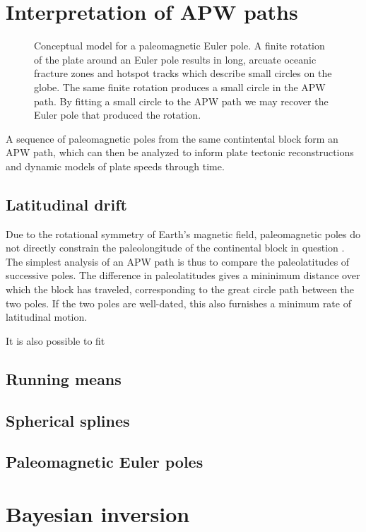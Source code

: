 \documentclass[preprint,12pt,authoryear]{elsarticle}
\begin{document}
\section{Interpretation of APW paths}
\label{sec:apwp}
\begin{figure}
\caption[Conceptual model for a paleomagnetic Euler pole.]{Conceptual model for a paleomagnetic Euler pole. A finite rotation of the plate around an Euler pole results in long, arcuate oceanic fracture zones and hotspot tracks which describe small circles on the globe. The same finite rotation produces a small circle in the APW path. By fitting a small circle to the APW path we may recover the Euler pole that produced the rotation.}
\label{fig:pep}
\end{figure}
A sequence of paleomagnetic poles from the same contintental block form an APW path,
which can then be analyzed to inform plate tectonic reconstructions and dynamic models
of plate speeds through time. 

\subsection{Latitudinal drift}
Due to the rotational symmetry of Earth's magnetic field, paleomagnetic poles do not
directly constrain the paleolongitude of the continental block in question \citep{butler1992paleomagnetism}.
The simplest analysis of an APW path is thus to compare the paleolatitudes of successive poles.
The difference in paleolatitudes gives a mininimum distance over which the block has traveled, 
corresponding to the great circle path between the two poles. If the two poles are well-dated,
this also furnishes a minimum rate of latitudinal motion.

It is also possible to fit
\subsection{Running means}

\subsection{Spherical splines}
\subsection{Paleomagnetic Euler poles}
\citet{gordon1984paleomagnetic}

\section{Bayesian inversion}
\label{sec:bayesian_inversion}
\end{document}
